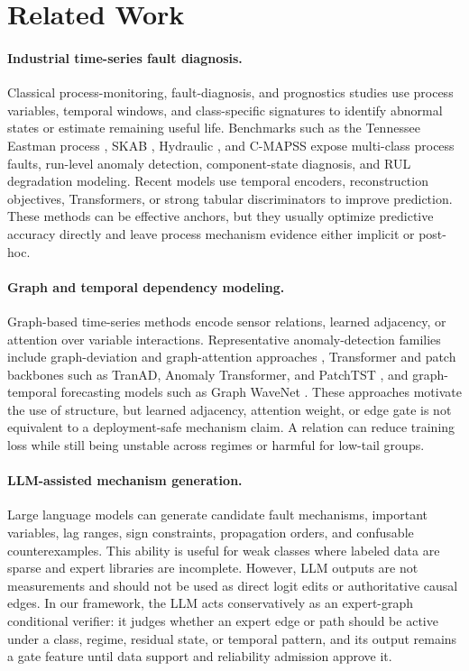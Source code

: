 \documentclass[letterpaper]{article}
\begin{document}
\section{Related Work}

\paragraph{Industrial time-series fault diagnosis.}
Classical process-monitoring, fault-diagnosis, and prognostics studies use process variables, temporal windows, and class-specific signatures to identify abnormal states or estimate remaining useful life. Benchmarks such as the Tennessee Eastman process \cite{downs1993tep}, SKAB \cite{skab2020}, Hydraulic \cite{helwig2018hydraulic}, and C-MAPSS \cite{saxena2008cmapss} expose multi-class process faults, run-level anomaly detection, component-state diagnosis, and RUL degradation modeling. Recent models use temporal encoders, reconstruction objectives, Transformers, or strong tabular discriminators to improve prediction. These methods can be effective anchors, but they usually optimize predictive accuracy directly and leave process mechanism evidence either implicit or post-hoc.

\paragraph{Graph and temporal dependency modeling.}
Graph-based time-series methods encode sensor relations, learned adjacency, or attention over variable interactions. Representative anomaly-detection families include graph-deviation and graph-attention approaches \cite{gdn2021,mtadgat2020}, Transformer and patch backbones such as TranAD, Anomaly Transformer, and PatchTST \cite{tranad2022,anomalytransformer2022,patchtst2023}, and graph-temporal forecasting models such as Graph WaveNet \cite{graphwavenet2019}. These approaches motivate the use of structure, but learned adjacency, attention weight, or edge gate is not equivalent to a deployment-safe mechanism claim. A relation can reduce training loss while still being unstable across regimes or harmful for low-tail groups.

\paragraph{LLM-assisted mechanism generation.}
Large language models can generate candidate fault mechanisms, important variables, lag ranges, sign constraints, propagation orders, and confusable counterexamples. This ability is useful for weak classes where labeled data are sparse and expert libraries are incomplete. However, LLM outputs are not measurements and should not be used as direct logit edits or authoritative causal edges. In our framework, the LLM acts conservatively as an expert-graph conditional verifier: it judges whether an expert edge or path should be active under a class, regime, residual state, or temporal pattern, and its output remains a gate feature until data support and reliability admission approve it.
\end{document}
